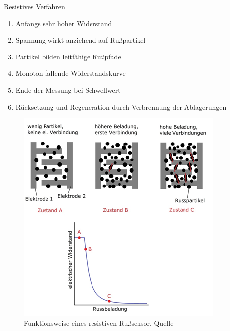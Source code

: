 \documentclass{beamer}
\begin{document}
	\begin{frame}{Resistives Verfahren}
	\begin{multicols}{2}
		\footnotesize{
			\begin{enumerate}
				\item Anfangs sehr hoher Widerstand
				\item Spannung wirkt anziehend auf Rußpartikel
				\item Partikel bilden leitfähige Rußpfade
				\item Monoton fallende Widerstandskurve
				\item Ende der Messung bei Schwellwert
				\item Rücksetzung und Regeneration durch Verbrennung der Ablagerungen
		\end{enumerate}}
		\begin{figure}
			\includegraphics[width=0.6\textheight]{russ_kurve.png}
			\caption{\footnotesize Funktionsweise eines resistiven Rußsensor. Quelle\cite{mtec}}
		\end{figure}
	\end{multicols}
	\end{frame}	
\end{document}
